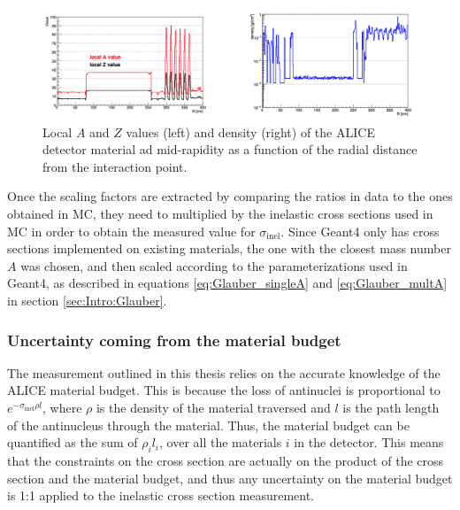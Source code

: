 \begin{figure}
    \centering
    \includegraphics[width=\textwidth]{figures/averageA.png}
    \caption{Local $A$ and $Z$ values (left) and density (right) of the ALICE detector material ad mid-rapidity as a function of the radial distance from the interaction point.}
    \label{fig:localMaterialValuesALICE}
\end{figure}

Once the scaling factors are extracted by comparing the ratios in data to the ones obtained in MC, they need to multiplied by the inelastic cross sections used in MC in order to obtain the measured value for $\sigma_{\mathrm{inel}}$. Since Geant4 only has cross sections implemented on existing materials, the one with the closest mass number $A$ was chosen, and then scaled according to the parameterizations used in Geant4, as described in equations \ref{eq:Glauber_singleA} and \ref{eq:Glauber_multA} in section \ref{sec:Intro:Glauber}.

\subsubsection{Uncertainty coming from the material budget}
The measurement outlined in this thesis relies on the accurate knowledge of the ALICE material budget. This is because the loss of antinuclei is proportional to $e^{-\sigma_\mathrm{inel} \rho l}$, where $\rho$ is the density of the material traversed and $l$ is the path length of the antinucleus through the material. Thus, the material budget can be quantified as the sum of $\rho_i l_i$, over all the materials $i$ in the detector. This means that the constraints on the cross section are actually on the product of the cross section and the material budget, and thus any uncertainty on the material budget is 1:1 applied to the inelastic cross section measurement. \\

